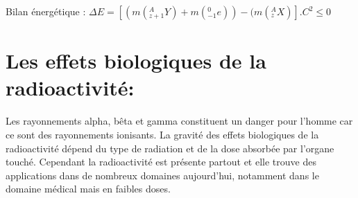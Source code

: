 \documentclass[12pt]{article}
\begin{document}
Bilan énergétique : $\Delta{E} =[(m(_{z+1}^{A}Y) + m(_{-1}^0e))- (m(_z^AX) ].C^2 \leq 0 $

\section{Les effets biologiques de la radioactivité:}

Les rayonnements alpha, bêta et gamma constituent un danger pour l’homme car ce sont des rayonnements
ionisants. La gravité des effets biologiques de la radioactivité dépend du type de radiation et de la dose absorbée par
l'organe touché. Cependant la radioactivité est présente partout et elle trouve des applications dans de nombreux
domaines aujourd’hui, notamment dans le domaine médical mais en faibles doses.





\end{document}
